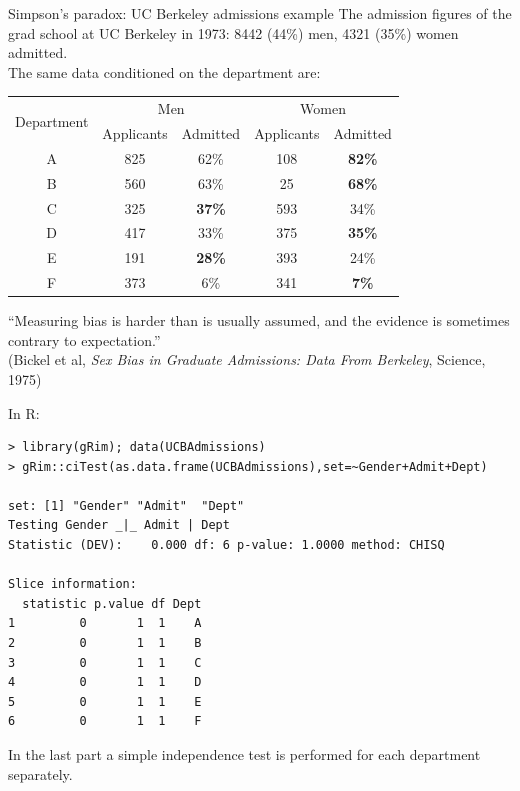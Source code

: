 \documentclass[11pt,handout,aspectratio=169,dvipsnames]{beamer}
\begin{document}
\begin{frame}[label=SP]{Simpson's paradox: UC Berkeley admissions example}
		The admission figures of the grad school at UC Berkeley in 1973: 8442 (44\%) men, 4321 (35\%) women admitted.\\[.3cm] The same data conditioned on the department are:\\[.3cm]
\hspace{.7cm}\begin{tabular}{|c|c|c|c|c|}
\hline
\multirow{2}{*}{Department} & \multicolumn{2}{c|}{Men}   & \multicolumn{2}{c|}{Women} \\ \cline{2-5} 
                            & Applicants & Admitted       & Applicants & Admitted       \\ \hline
A                           & 825        & 62\%          & 108        & \textbf{82\%} \\ \hline
B                           & 560        & 63\%          & 25         & \textbf{68\%} \\ \hline
C                           & 325        & \textbf{37\%} & 593        & 34\%          \\ \hline
D                           & 417        & 33\%          & 375        & \textbf{35\%} \\ \hline
E                           & 191        & \textbf{28\%} & 393        & 24\%          \\ \hline
F                           & 373        & 6\%           & 341        & \textbf{7\%}  \\ \hline
\end{tabular}
\medskip

``Measuring bias is harder than is usually assumed, and the evidence is sometimes contrary to expectation.''\\[.3cm] \tiny(Bickel et al,  \textit{Sex Bias in Graduate Admissions: Data From Berkeley}, Science, 1975) 
\end{frame}

\begin{frame}[fragile]{}
	In R:
	\begin{lstlisting}
> library(gRim); data(UCBAdmissions)
> gRim::ciTest(as.data.frame(UCBAdmissions),set=~Gender+Admit+Dept)

set: [1] "Gender" "Admit"  "Dept"  
Testing Gender _|_ Admit | Dept 
Statistic (DEV):    0.000 df: 6 p-value: 1.0000 method: CHISQ

Slice information:
  statistic p.value df Dept
1         0       1  1    A
2         0       1  1    B
3         0       1  1    C
4         0       1  1    D
5         0       1  1    E
6         0       1  1    F
 \end{lstlisting}
 In the last part a simple independence test is performed for each department separately. 
\end{frame}
\end{document}
